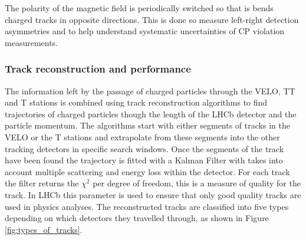 The polarity of the magnetic field is periodically switched so that is bends charged tracks in opposite directions. This is done so measure left-right detection asymmetries and to help understand systematic uncertainties of CP violation measurements. %



\subsubsection{Track reconstruction and performance}
\label{sec:Track_recon}


The information left by the passage of charged particles through the VELO, TT and T stations is combined using track reconstruction algorithms to find trajectories of charged particles though the length of the LHCb detector and the particle momentum.  
The algorithms start with either segments of tracks in the VELO or the T stations and extrapolate from these segments into the other tracking detectors in specific search windows. 
Once the segments of the track have been found the trajectory is fitted with a Kalman Filter with takes into account multiple scattering and energy loss within the detector. For each track the filter returns the $\chi^{2}$ per degree of freedom, this is a measure of quality for the track. In LHCb this parameter is used to ensure that only good quality tracks are used in physics analyses. 
The reconstructed tracks are classified into five types depending on which detectors they travelled through, as shown in Figure \ref{fig:types_of_tracks}.



